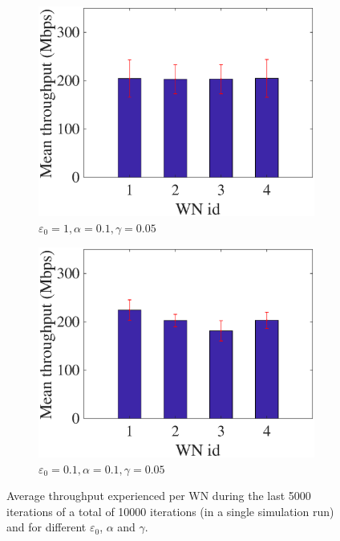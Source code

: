 \documentclass{article}
\begin{document}
\begin{figure}[]
\begin{subfigure}[b]{0.225\textwidth}
			\includegraphics[width=\textwidth]{images/e_1_a_01_g_005_avg_tpt}
			\caption{$\varepsilon_0=1, \alpha=0.1, \gamma=0.05$}
			\label{fig:e_1_a_0.1_g_0.05_avg_tpt}
		\end{subfigure}
		\begin{subfigure}[b]{0.225\textwidth}
			\includegraphics[width=\textwidth]{images/e_01_a_01_g_005_avg_tpt}
			\caption{$\varepsilon_0=0.1, \alpha=0.1, \gamma=0.05$}
			\label{fig:e_0.1_a_0.1_g_0.05_avg_tpt}
		\end{subfigure}
		\caption{Average throughput experienced per WN during the last 5000 iterations of a total of 10000 iterations (in a single simulation run) and for different $\varepsilon_0$, $\alpha$ and $\gamma$.}
		\label{fig:ql_params_eval_average_tpt}
	\end{figure}
	
\end{document}
